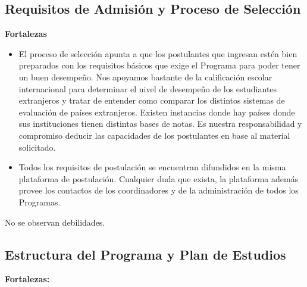\subsection{Requisitos de Admisión y Proceso de Selección}

\noindent\textbf{Fortalezas}

\begin{itemize}
\item El proceso de selección apunta a que los postulantes que ingresan estén bien preparados con los requisitos básicos que exige 
el Programa para poder tener un buen desempeño. Nos apoyamos bastante de la calificación escolar internacional para determinar el 
nivel de desempeño de los estudiantes extranjeros y tratar de entender como comparar los distintos sistemas de evaluación de países 
extranjeros. Existen instancias donde hay países donde sus instituciones tienen distintas bases de notas. Es nuestra responsabilidad y 
compromiso deducir las capacidades de los postulantes en base al material solicitado.
\item Todos los requisitos de postulación se encuentran difundidos en la misma plataforma de postulación. Cualquier duda que exista, la plataforma
además provee los contactos de los coordinadores y de la administración de todos los Programas.
\end{itemize}

No se observan debilidades.

\subsection{Estructura del Programa y Plan de Estudios}

\noindent\textbf{Fortalezas:}

